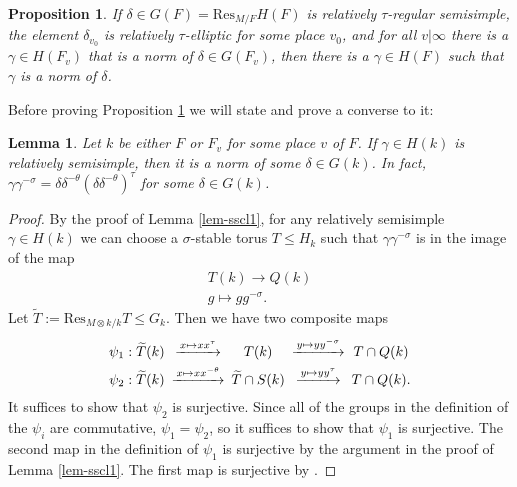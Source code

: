 \documentclass[12pt]{amsart}
\newtheorem{lem}[thm]{Lemma}
\newtheorem{prop}[thm]{Proposition}
\theoremstyle{remark}
\numberwithin{equation}{section}
\newcommand{\lto}{\longrightarrow}
\theoremstyle{definition}
\numberwithin{equation}{subsection}
\begin{document}
\begin{prop} \label{matching-prop} If $\delta \in G(F)=\mathrm{Res}_{M/F}H(F)$ is relatively $\tau$-regular
semisimple, the element $\delta_{v_0}$ is relatively $\tau$-elliptic for some place $v_0$, and for all $v|\infty$ there is a $\gamma \in H(F_v)$ that is a norm of $\delta \in G(F_v)$,
then there is a $\gamma \in H(F)$ such that $\gamma$ is a norm of $\delta$.
\end{prop}

Before proving Proposition \ref{matching-prop} we will state and prove a converse to it:

\begin{lem} \label{matching-lem}
Let $k$ be either $F$ or $F_v$ for some place $v$ of $F$.  If $\gamma \in
H(k)$ is relatively semisimple, then it is a norm of some $\delta \in
G(k)$.  In fact, $\gamma\gamma^{-\sigma}=\delta\delta^{-\theta}(\delta\delta^{-\theta})^{\tau}$
for some $\delta \in
G(k)$.
\end{lem}

\begin{proof}
By the proof of Lemma \ref{lem-sscl1}, for any relatively semisimple $\gamma \in H(k)$ we can choose a $\sigma$-stable torus
 $T \leq H_k$ such that $\gamma \gamma^{-\sigma}$ is in the image of the map
 \begin{align*}
 T(k) \lto Q(k)\\
 g \longmapsto gg^{-\sigma}.
 \end{align*}
Let $\widetilde{T}:=\mathrm{Res}_{M \otimes k/k}T \leq G_k$.  Then we have two composite maps
$$
\begin{CD}
\psi_1:\widetilde{T}(k) @>{x \mapsto x x^{\tau}}>>T(k) @>{y \mapsto y y^{-\sigma}}>> T \cap Q(k)\\
\psi_2:\widetilde{T}(k) @>{x \mapsto xx^{-\theta}}>> \widetilde{T} \cap S(k) @>{y \mapsto y y^{\tau}}>> T \cap  Q(k).
\end{CD}
$$
It suffices to show that $\psi_2$ is surjective.  Since all of the groups in the
definition of the $\psi_i$
are commutative, $\psi_1=\psi_2$, so it suffices to show that $\psi_1$ is
surjective.  The second map in the definition of $\psi_1$ is surjective by the argument in
the proof of Lemma \ref{lem-sscl1}.  The first map is
surjective by \cite[Proposition 3.11.1(a)]{Rog}.
\end{proof}
\end{document}
